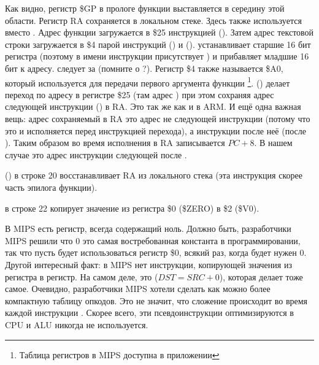 Как видно, регистр \$GP в прологе функции выставляется в середину этой области.
Регистр \ac{RA} сохраняется в локальном стеке.
Здесь также используется \puts вместо \printf.
Адрес функции \puts загружается в \$25 инструкцией  ().
Затем адрес текстовой строки загружается в \$4 парой инструкций  () и
 ().
 устанавливает старшие 16 бит регистра (поэтому в имени инструкции присутствует ) и 
прибавляет младшие 16 бит к адресу.
 следует за  (помните о ?).
Регистр \$4 также называется \$A0, который используется для передачи первого аргумента функции
\footnote{Таблица регистров в MIPS доступна в приложении }.
 () делает переход по адресу в регистре \$25 (там адрес \puts) 
при этом сохраняя адрес следующей инструкции () в \ac{RA}.
Это так же как и в ARM.
И ещё одна важная вещь: адрес сохраняемый в \ac{RA} это адрес не следующей инструкции (потому что
это  и исполняется перед инструкцией перехода),
а инструкции после неё (после ).
Таким образом во время исполнения  в \ac{RA} записывается $PC + 8$.
В нашем случае это адрес инструкции  следующей после .

 () в строке 20 восстанавливает \ac{RA} из локального стека (эта инструкция скорее часть эпилога функции).

 в строке 22 копирует значение из регистра \$0 (\$ZERO) в \$2 (\$V0).

\label{MIPS_zero_register}
В MIPS есть  регистр, всегда содержащий ноль.
Должно быть, разработчики MIPS решили что 0 это самая востребованная константа в программировании,
так что пусть будет использоваться регистр \$0, всякий раз, когда будет нужен 0.
Другой интересный факт: в MIPS нет инструкции, копирующей значения из регистра в регистр.
На самом деле,  это  ($DST=SRC+0$), которая делает тоже самое.
Очевидно, разработчики MIPS хотели сделать как можно более компактную таблицу опкодов.
Это не значит, что сложение происходит во время каждой инструкции .
Скорее всего, эти псевдоинструкции оптимизируются в \ac{CPU} и \ac{ALU} никогда не используется.

